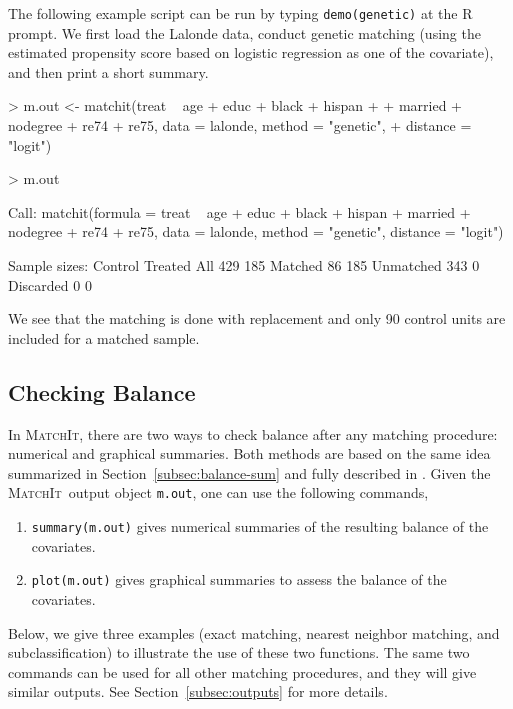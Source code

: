 \documentclass[oneside,letterpaper,titlepage]{article}
\newcommand{\MatchIt}{\textsc{MatchIt}}
\begin{document}
The following example script can be run by typing {\tt demo(genetic)}
at the R prompt.  We first load the Lalonde data, conduct genetic
matching (using the estimated propensity score based on logistic
regression as one of the covariate), and then print a short summary.
\begin{Schunk}
\begin{Sinput}
> m.out <- matchit(treat ~ age + educ + black + hispan + 
+     married + nodegree + re74 + re75, data = lalonde, method = "genetic", 
+     distance = "logit")
\end{Sinput}
\end{Schunk}
\begin{Schunk}
\begin{Sinput}
> m.out
\end{Sinput}
\begin{Soutput}
Call: 
matchit(formula = treat ~ age + educ + black + hispan + married + 
    nodegree + re74 + re75, data = lalonde, method = "genetic", 
    distance = "logit")

Sample sizes:
          Control Treated
All           429     185
Matched        86     185
Unmatched     343       0
Discarded       0       0
\end{Soutput}
\end{Schunk}
We see that the matching is done with replacement and only 90 control
units are included for a matched sample.



\subsection{Checking Balance}
\label{subsec:balance}

In \MatchIt, there are two ways to check balance after any matching
procedure: numerical and graphical summaries. Both methods are based
on the same idea summarized in Section~\ref{subsec:balance-sum} and
fully described in \citet*{HoImaKin05}. Given the \MatchIt\ output
object {\tt m.out}, one can use the following commands,
\begin{enumerate}
\item \texttt{summary(m.out)} gives numerical summaries of the
  resulting balance of the covariates.
  
\item \texttt{plot(m.out)} gives graphical summaries to assess the balance
  of the covariates.
\end{enumerate}
Below, we give three examples (exact matching, nearest neighbor
matching, and subclassification) to illustrate the use of these two
functions. The same two commands can be used for all other matching
procedures, and they will give similar outputs. See
Section~\ref{subsec:outputs} for more details.
\end{document}
